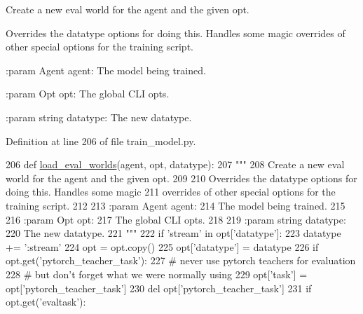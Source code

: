 \begin{DoxyVerb}Create a new eval world for the agent and the given opt.

Overrides the datatype options for doing this.  Handles some magic
overrides of other special options for the training script.

:param Agent agent:
    The model being trained.

:param Opt opt:
    The global CLI opts.

:param string datatype:
    The new datatype.
\end{DoxyVerb}
 

Definition at line 206 of file train\+\_\+model.\+py.


\begin{DoxyCode}
206 \textcolor{keyword}{def }\hyperlink{namespaceparlai_1_1scripts_1_1train__model_a70da71a6f4f9ad144666e6353d9278e3}{load\_eval\_worlds}(agent, opt, datatype):
207     \textcolor{stringliteral}{"""}
208 \textcolor{stringliteral}{    Create a new eval world for the agent and the given opt.}
209 \textcolor{stringliteral}{}
210 \textcolor{stringliteral}{    Overrides the datatype options for doing this.  Handles some magic}
211 \textcolor{stringliteral}{    overrides of other special options for the training script.}
212 \textcolor{stringliteral}{}
213 \textcolor{stringliteral}{    :param Agent agent:}
214 \textcolor{stringliteral}{        The model being trained.}
215 \textcolor{stringliteral}{}
216 \textcolor{stringliteral}{    :param Opt opt:}
217 \textcolor{stringliteral}{        The global CLI opts.}
218 \textcolor{stringliteral}{}
219 \textcolor{stringliteral}{    :param string datatype:}
220 \textcolor{stringliteral}{        The new datatype.}
221 \textcolor{stringliteral}{    """}
222     \textcolor{keywordflow}{if} \textcolor{stringliteral}{'stream'} \textcolor{keywordflow}{in} opt[\textcolor{stringliteral}{'datatype'}]:
223         datatype += \textcolor{stringliteral}{':stream'}
224     opt = opt.copy()
225     opt[\textcolor{stringliteral}{'datatype'}] = datatype
226     \textcolor{keywordflow}{if} opt.get(\textcolor{stringliteral}{'pytorch\_teacher\_task'}):
227         \textcolor{comment}{# never use pytorch teachers for evaluation}
228         \textcolor{comment}{# but don't forget what we were normally using}
229         opt[\textcolor{stringliteral}{'task'}] = opt[\textcolor{stringliteral}{'pytorch\_teacher\_task'}]
230         del opt[\textcolor{stringliteral}{'pytorch\_teacher\_task'}]
231     \textcolor{keywordflow}{if} opt.get(\textcolor{stringliteral}{'evaltask'}):

\end{DoxyCode}
